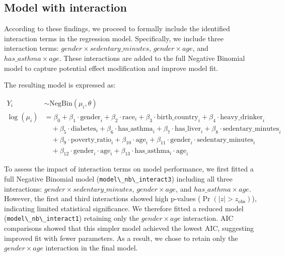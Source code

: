 \documentclass[
  11pt,
]{article}
\newcommand{\passthrough}[1]{#1}
\begin{document}
\subsection{Model with interaction}\label{model-with-interaction}

According to these findings, we proceed to formally include the identified interaction terms in the regression model. Specifically, we include three interaction terms: \(gender \times sedentary\_minutes\), \(gender \times age\), and \(has\_asthma \times age\). These interactions are added to the full Negative Binomial model to capture potential effect modification and improve model fit.

The resulting model is expressed as:

\begin{align*}
Y_i &\sim \text{NegBin}(\mu_i, \theta) \\
\log(\mu_i) &= \beta_0 
+ \beta_1 \cdot \text{gender}_i 
+ \beta_2 \cdot \text{race}_i 
+ \beta_3 \cdot \text{birth\_country}_i 
+ \beta_4 \cdot \text{heavy\_drinker}_i \\
&\quad + \beta_5 \cdot \text{diabetes}_i 
+ \beta_6 \cdot \text{has\_asthma}_i 
+ \beta_7 \cdot \text{has\_liver}_i 
+ \beta_8 \cdot \text{sedentary\_minutes}_i \\
&\quad + \beta_9 \cdot \text{poverty\_ratio}_i 
+ \beta_{10} \cdot \text{age}_i 
+ \beta_{11} \cdot \text{gender}_i \cdot \text{sedentary\_minutes}_i \\
&\quad + \beta_{12} \cdot \text{gender}_i \cdot \text{age}_i
+ \beta_{13} \cdot \text{has\_asthma}_i \cdot \text{age}_i
\end{align*}

To assess the impact of interaction terms on model performance, we first fitted a full Negative Binomial model (\passthrough{\lstinline!model\_nb\_interact3!}) including all three interactions: \(gender \times sedentary\_minutes\), \(gender \times age\), and \(has\_asthma \times age\). However, the first and third interactions showed high p-values (\(\Pr(|z| > z_{\text{obs}})\)), indicating limited statistical significance. We therefore fitted a reduced model (\passthrough{\lstinline!model\_nb\_interact1!}) retaining only the \(gender \times age\) interaction. AIC comparisons showed that this simpler model achieved the lowest AIC, suggesting improved fit with fewer parameters. As a result, we chose to retain only the \(gender \times age\) interaction in the final model.

\begin{table}[!h]
\centering
\caption{\label{tab:table4}Negative Binomial Models Comparison with Interaction Terms}
\centering
{}
\end{table}
\end{document}
